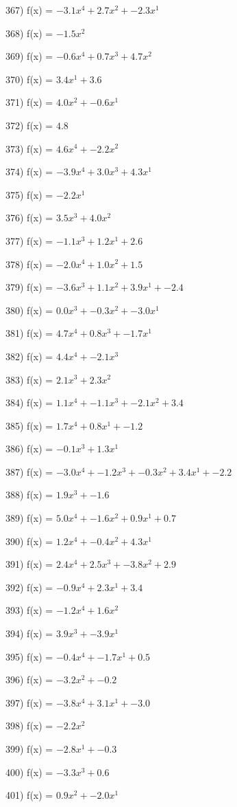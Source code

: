 \documentclass[10pt,a4paper]{article}
\begin{document}
367) f(x) = $-3.1x^4 + 2.7x^2 + -2.3x^1$

368) f(x) = $-1.5x^2$

369) f(x) = $-0.6x^4 + 0.7x^3 + 4.7x^2$

370) f(x) = $3.4x^1 + 3.6$

371) f(x) = $4.0x^2 + -0.6x^1$

372) f(x) = $4.8$

373) f(x) = $4.6x^4 + -2.2x^2$

374) f(x) = $-3.9x^4 + 3.0x^3 + 4.3x^1$

375) f(x) = $-2.2x^1$

376) f(x) = $3.5x^3 + 4.0x^2$

377) f(x) = $-1.1x^3 + 1.2x^1 + 2.6$

378) f(x) = $-2.0x^4 + 1.0x^2 + 1.5$

379) f(x) = $-3.6x^3 + 1.1x^2 + 3.9x^1 + -2.4$

380) f(x) = $0.0x^3 + -0.3x^2 + -3.0x^1$

381) f(x) = $4.7x^4 + 0.8x^3 + -1.7x^1$

382) f(x) = $4.4x^4 + -2.1x^3$

383) f(x) = $2.1x^3 + 2.3x^2$

384) f(x) = $1.1x^4 + -1.1x^3 + -2.1x^2 + 3.4$

385) f(x) = $1.7x^4 + 0.8x^1 + -1.2$

386) f(x) = $-0.1x^3 + 1.3x^1$

387) f(x) = $-3.0x^4 + -1.2x^3 + -0.3x^2 + 3.4x^1 + -2.2$

388) f(x) = $1.9x^3 + -1.6$

389) f(x) = $5.0x^4 + -1.6x^2 + 0.9x^1 + 0.7$

390) f(x) = $1.2x^4 + -0.4x^2 + 4.3x^1$

391) f(x) = $2.4x^4 + 2.5x^3 + -3.8x^2 + 2.9$

392) f(x) = $-0.9x^4 + 2.3x^1 + 3.4$

393) f(x) = $-1.2x^4 + 1.6x^2$

394) f(x) = $3.9x^3 + -3.9x^1$

395) f(x) = $-0.4x^4 + -1.7x^1 + 0.5$

396) f(x) = $-3.2x^2 + -0.2$

397) f(x) = $-3.8x^4 + 3.1x^1 + -3.0$

398) f(x) = $-2.2x^2$

399) f(x) = $-2.8x^1 + -0.3$

400) f(x) = $-3.3x^3 + 0.6$

401) f(x) = $0.9x^2 + -2.0x^1$
\end{document}
